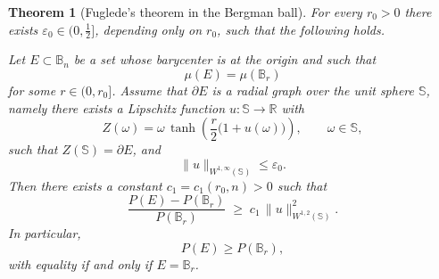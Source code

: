 \documentclass[10pt,a4paper]{amsart}
\newtheorem{theorem}{Theorem}
\def\ge{\geqslant}
\begin{document}
\begin{theorem}[Fuglede's theorem in the Bergman ball]\label{mainth}
For every $r_0>0$ there exists $\varepsilon_0\in\bigl(0,\tfrac12\bigr]$, depending only on $r_0$,
such that the following holds.

Let $E\subset \mathbb{B}_n$ be a set whose barycenter is at the origin and such that
\begin{equation}\label{eq:vol_constraint_thm}
\mu(E)=\mu(\mathbb{B}_r)
\end{equation}
for some $r\in(0,r_0]$. Assume that $\partial E$ is a radial graph over the unit sphere
$\mathbb{S}$, namely there exists a Lipschitz function $u:\mathbb{S}\to\mathbb{R}$ with
\begin{equation}\label{eq:graph_param_thm}
Z(\omega)=\omega\,\tanh\!\left(\frac r2\bigl(1+u(\omega)\bigr)\right),\qquad \omega\in\mathbb{S},
\end{equation}
such that $Z(\mathbb{S})=\partial E$, and
\begin{equation}\label{eq:u_small_thm}
\|u\|_{W^{1,\infty}(\mathbb{S})}\le \varepsilon_0.
\end{equation}
Then there exists a constant $c_1=c_1(r_0,n)>0$ such that
\begin{equation}\label{eq:fuglede_estimate}
\frac{P(E)-P(\mathbb{B}_r)}{P(\mathbb{B}_r)}
\;\ge\;
c_1\,\|u\|_{W^{1,2}(\mathbb{S})}^2.
\end{equation} In particular,
\[
P(E)\ge P(\mathbb B_r),
\]
with equality if and only if $E=\mathbb B_r$.
\end{theorem}
\end{document}
